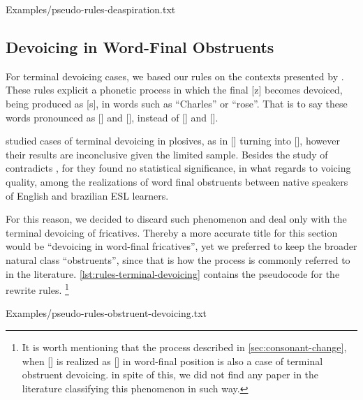 %
    {Examples/pseudo-rules-deaspiration.txt}
    
    

\subsection{Devoicing in Word-Final Obstruents}

For terminal devoicing cases, we based our rules on the contexts presented by \citeauthor{Castilho2004} \citep{Castilho2004}.
These rules explicit a phonetic process in which the final [z] becomes devoiced, being produced as [s], in words such as ``Charles'' 
or ``rose''. That is to say these words pronounced as [] and [], instead of [] 
and [].

\citeauthor{Albuquerque2011} \citep{Albuquerque2011} studied cases of terminal devoicing in plosives, as in [] 
turning into [], however their results are inconclusive given the limited sample. 
Besides the study of \citeauthor{Zimmer2012} contradicts \citeauthor{Albuquerque2011} \citep{Albuquerque2011}, for they found 
no statistical significance, in what regards to voicing quality, among the realizations of word final obstruents
between native speakers of English and brazilian \ac{ESL} learners.

For this reason, we decided to discard such phenomenon and deal only with the terminal devoicing of fricatives.
Thereby a more accurate title for this section would be ``devoicing in word-final fricatives'', yet we 
preferred to keep the broader natural class ``obstruents'', since that is how the process is commonly referred to in the literature. 
\autoref{lst:rules-terminal-devoicing} contains the pseudocode for the rewrite rules.
\footnote{It is worth mentioning that the process described in \autoref{sec:consonant-change}, when [] is realized as
[] in word-final position is also a case of terminal obstruent devoicing. in spite of this, we did not
find any paper in the literature classifying this phenomenon in such way.}

%
    {Examples/pseudo-rules-obstruent-devoicing.txt}

